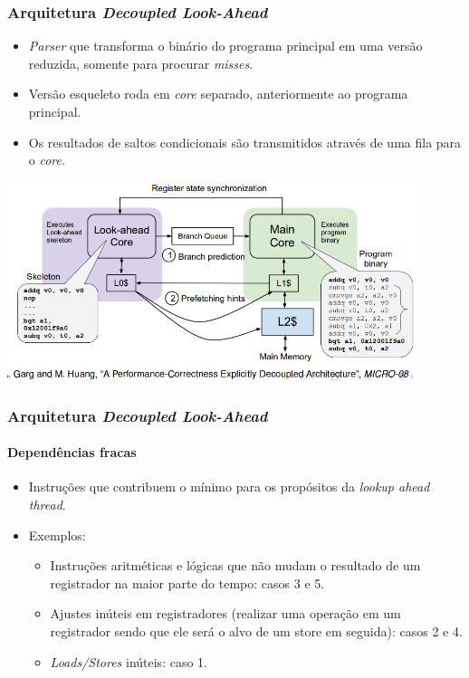 \documentclass[10pt]{beamer}
\begin{document}
\begin{frame}
\frametitle{Arquitetura \textit{Decoupled Look-Ahead}}

\begin{itemize}
\item \textit{Parser} que transforma o binário do programa principal em uma
versão reduzida, somente para procurar \textit{misses}.
\item Versão esqueleto roda em \textit{core} separado, anteriormente ao programa
principal.
\item Os resultados de saltos condicionais são transmitidos através
de uma fila para o \textit{core}.
\end{itemize}

\centering
\includegraphics[width=0.9\textwidth]{images/look-ahead}

\end{frame}

\begin{frame}
\frametitle{Arquitetura \textit{Decoupled Look-Ahead}}
\framesubtitle{Dependências fracas}

\begin{itemize}
 \item Instruções que contribuem o mínimo para os propósitos da \textit{lookup
ahead thread}.
\vspace{12pt}
\item Exemplos:
\begin{itemize}
	\item Instruções aritméticas e lógicas que não mudam o resultado de um
	registrador na maior parte do tempo: casos 3 e 5.
	\item Ajustes inúteis em registradores (realizar uma operação em um registrador
	sendo que ele será o alvo de um store em seguida): casos 2 e 4.
	\item \textit{Loads/Stores} inúteis: caso 1.
\end{itemize}
\end{itemize}
\end{frame}
\end{document}
